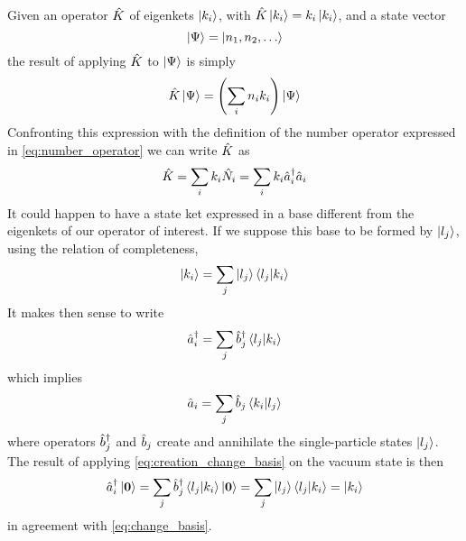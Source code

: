 Given an operator $\hat{K}$ of eigenkets $\ket{k_i}$, with $\hat{K} \ket{k_i} = k_i\ket{k_i}$, and a state vector
\begin{equation}
    \ket{\Psi} = \ket{n_1, n_2, \dots}
\end{equation}
the result of applying $\hat{K}$ to $\ket{\Psi}$ is simply
\begin{equation}
    \hat{K}\ket{\Psi} = \left( \sum_i n_i k_i \right) \ket{\Psi}
\end{equation}
Confronting this expression with the definition of the number operator expressed in \cref{eq:number_operator} we can write $\hat{K}$ as
\begin{equation}
    \label{eq:creation_annihilation_operator}
    \hat{K} = \sum_i k_i \hat{N}_i = \sum_i k_i  \hat{a}^\dagger_i\hat{a}_i
\end{equation}
It could happen to have a state ket expressed in a base different from the eigenkets of our operator of interest. If we suppose this base to be formed by $\ket{l_j}$, using the relation of completeness,
\begin{equation} \label{eq:change_basis}
    \ket{k_i} = \sum_j \ket{l_j} \braket{l_j}{k_i}
\end{equation}
It makes then sense to write
\begin{equation} \label{eq:creation_change_basis}
    \hat{a}^\dagger_i = \sum_j \hat{b}^\dagger_j \braket{l_j}{k_i}
\end{equation}
which implies
\begin{equation}
    \hat{a}_i = \sum_j \hat{b}_j \braket{k_i}{l_j}
\end{equation}
where operators $\hat{b}^\dagger_j$ and $\hat{b}_j$ create and annihilate the single-particle states $\ket{l_j}$. The result of applying \cref{eq:creation_change_basis} on the vacuum state is then
\begin{equation}
    \hat{a}^\dagger_i \ket{\mathbf{\boldsymbol{0}}} = \sum_j \hat{b}^\dagger_j \braket{l_j}{k_i} \ket{\mathbf{\boldsymbol{0}}} = \sum_j \ket{l_j} \braket{l_j}{k_i} = \ket{k_i}
\end{equation}
in agreement with \cref{eq:change_basis}.

